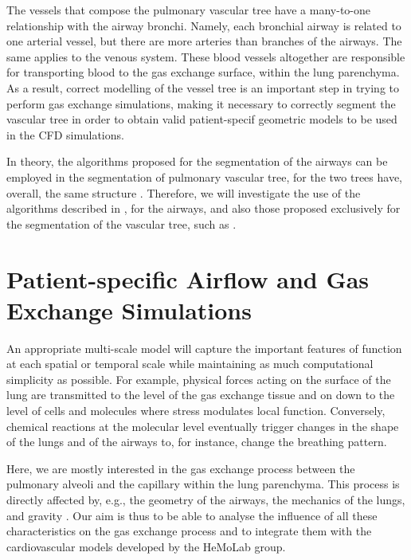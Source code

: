 \challenge

The vessels that compose the pulmonary vascular tree have a many-to-one relationship with the airway bronchi. Namely, each bronchial airway is related to one arterial vessel, but there are more arteries than branches of the airways. The same applies to the venous system. These blood vessels altogether are responsible for transporting blood to the gas exchange surface, within the lung parenchyma. As a result, correct modelling of the vessel tree is an important step in trying to perform gas exchange simulations, making it necessary to correctly segment the vascular tree in order to obtain valid patient-specif geometric models to be used in the CFD simulations. 

\approach

\begin{sloppypar}
In theory, the algorithms proposed for the segmentation of the airways can be employed in the segmentation of pulmonary vascular tree, for the two trees have, overall, the same structure \citep{TawhaiM2011}. Therefore, we will investigate the use of the algorithms described in \citep{Lo}, for the airways, and also those proposed exclusively for the segmentation of the vascular tree, such as \citep{Dongen,Ebrahimdoost,Gutierrez,Linguraru,Shikata,Wala}.
\end{sloppypar}

\section{Patient-specific Airflow and Gas Exchange Simulations}

\challenge

An appropriate multi-scale model will capture the important features of function at each spatial or temporal scale while maintaining as much computational simplicity as possible. For example, physical forces acting on the surface of the lung are transmitted to the level of the gas exchange tissue and on down to the level of cells and molecules where stress modulates local function. Conversely, chemical reactions at the molecular level eventually trigger changes in the shape of the lungs and of the airways to, for instance, change the breathing pattern.

Here, we are mostly interested in the gas exchange process between the pulmonary alveoli and the capillary within the lung parenchyma. This process is directly affected by, e.g., the geometry of the airways, the mechanics of the lungs, and gravity  \citep{Tawhai2010}. Our aim is thus to be able to analyse the influence of all these characteristics on the gas exchange process and to integrate them with the cardiovascular models developed by the HeMoLab group.

